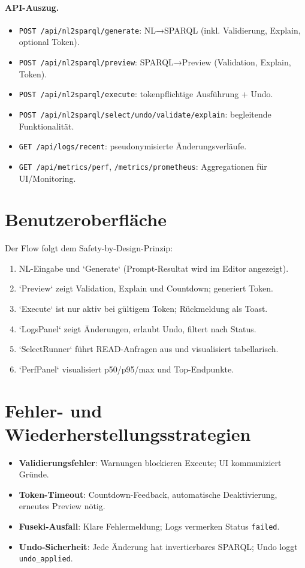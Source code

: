 \paragraph{API-Auszug.}
\begin{itemize}
  \item \texttt{POST /api/nl2sparql/generate}: NL→SPARQL (inkl. Validierung, Explain, optional Token).
  \item \texttt{POST /api/nl2sparql/preview}: SPARQL→Preview (Validation, Explain, Token).
  \item \texttt{POST /api/nl2sparql/execute}: tokenpflichtige Ausführung + Undo.
  \item \texttt{POST /api/nl2sparql/select/undo/validate/explain}: begleitende Funktionalität.
  \item \texttt{GET /api/logs/recent}: pseudonymisierte Änderungsverläufe.
  \item \texttt{GET /api/metrics/perf}, \texttt{/metrics/prometheus}: Aggregationen für UI/Monitoring.
\end{itemize}

\section{Benutzeroberfläche}
Der Flow folgt dem Safety-by-Design-Prinzip:
\begin{enumerate}
  \item NL-Eingabe und `Generate` (Prompt-Resultat wird im Editor angezeigt).
  \item `Preview` zeigt Validation, Explain und Countdown; generiert Token.
  \item `Execute` ist nur aktiv bei gültigem Token; Rückmeldung als Toast.
  \item `LogsPanel` zeigt Änderungen, erlaubt Undo, filtert nach Status.
  \item `SelectRunner` führt READ-Anfragen aus und visualisiert tabellarisch.
  \item `PerfPanel` visualisiert p50/p95/max und Top-Endpunkte.
\end{enumerate}

\section{Fehler- und Wiederherstellungsstrategien}
\begin{itemize}
  \item \textbf{Validierungsfehler}: Warnungen blockieren Execute; UI kommuniziert Gründe.
  \item \textbf{Token-Timeout}: Countdown-Feedback, automatische Deaktivierung, erneutes Preview nötig.
  \item \textbf{Fuseki-Ausfall}: Klare Fehlermeldung; Logs vermerken Status \texttt{failed}.
  \item \textbf{Undo-Sicherheit}: Jede Änderung hat invertierbares SPARQL; Undo loggt \texttt{undo\_applied}.
\end{itemize}

